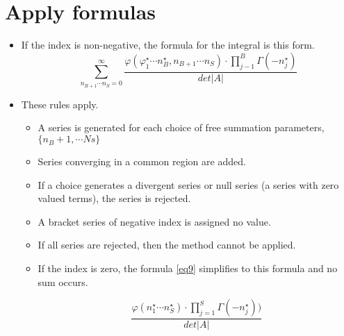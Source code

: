 \documentclass{article}
\begin{document}
\section{Apply formulas}
\begin{itemize}
    \item If the index is non-negative, the formula for the integral is this form.\cite{adv_applied_maths}
    \begin{equation}
    \label{eq9}
        \sum_{n_{B+1}\cdots n_S = 0}^\infty\frac{\varphi(\varphi_1^\star\cdots n_B^\star,n_{B+1}\cdots n_S)\cdot\prod_{j-1}^B\Gamma(-n_j^\star)}{det\vert A \vert}
    \end{equation}

    \item These rules apply.\cite{open_maths}
    \begin{itemize}
        \item A series is generated for each choice of free summation parameters, $\{n_B + 1, \cdots Ns\}$
        \item Series converging in a common region are added.
        \item If a choice generates a divergent series or null series (a series with zero valued terms), the series is rejected.
        \item A bracket series of negative index is assigned no value.
        \item If all series are rejected, then the method cannot be applied.
        \item If the index is zero, the formula \ref{eq9} simplifies to this formula and no sum occurs.

        \begin{equation}
        \label{eq10}
        \frac{\varphi(n_1^\star\cdots n_S^\star)\cdot\prod_{j=1}^S \Gamma (-n_j^\star))}{det \vert A \vert}
        \end{equation}
    \end{itemize}
\end{itemize}
\end{document}
